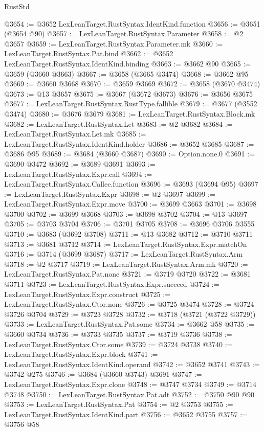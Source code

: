 \begin{lexlean}{RustStd}
\begin{coremodule}
@3654 := @3652 LexLeanTarget.RustSyntax.IdentKind.function
@3656 := @3651 (@3654 @90)
@3657 := LexLeanTarget.RustSyntax.Parameter
@3658 := @2 @3657
@3659 := LexLeanTarget.RustSyntax.Parameter.mk
@3660 := LexLeanTarget.RustSyntax.Pat.bind
@3662 := @3652 LexLeanTarget.RustSyntax.IdentKind.binding
@3663 := @3662 @90
@3665 := @3659 (@3660 @3663)
@3667 := @3658 (@3665 @3474)
@3668 := @3662 @95
@3669 := @3660 @3668
@3670 := @3659 @3669
@3672 := @3658 (@3670 @3474)
@3673 := @13 @3657
@3675 := @3667 (@3672 @3673)
@3676 := @3656 @3675
@3677 := LexLeanTarget.RustSyntax.RustType.fallible
@3679 := @3677 (@3552 @3474)
@3680 := @3676 @3679
@3681 := LexLeanTarget.RustSyntax.Block.mk
@3682 := LexLeanTarget.RustSyntax.Let
@3683 := @2 @3682
@3684 := LexLeanTarget.RustSyntax.Let.mk
@3685 := LexLeanTarget.RustSyntax.IdentKind.holder
@3686 := @3652 @3685
@3687 := @3686 @95
@3689 := @3684 (@3660 @3687)
@3690 := Option.none.{0}
@3691 := @3690 @3472
@3692 := @3689 @3691
@3693 := LexLeanTarget.RustSyntax.Expr.call
@3694 := LexLeanTarget.RustSyntax.Callee.function
@3696 := @3693 (@3694 @95)
@3697 := LexLeanTarget.RustSyntax.Expr
@3698 := @2 @3697
@3699 := LexLeanTarget.RustSyntax.Expr.move
@3700 := @3699 @3663
@3701 := @3698 @3700
@3702 := @3699 @3668
@3703 := @3698 @3702
@3704 := @13 @3697
@3705 := @3703 @3704
@3706 := @3701 @3705
@3708 := @3696 @3706 @3555
@3710 := @3683 (@3692 @3708)
@3711 := @13 @3682
@3712 := @3710 @3711
@3713 := @3681 @3712
@3714 := LexLeanTarget.RustSyntax.Expr.matchOn
@3716 := @3714 (@3699 @3687)
@3717 := LexLeanTarget.RustSyntax.Arm
@3718 := @2 @3717
@3719 := LexLeanTarget.RustSyntax.Arm.mk
@3720 := LexLeanTarget.RustSyntax.Pat.none
@3721 := @3719 @3720
@3722 := @3681 @3711
@3723 := LexLeanTarget.RustSyntax.Expr.succeed
@3724 := LexLeanTarget.RustSyntax.Expr.construct
@3725 := LexLeanTarget.RustSyntax.Ctor.none
@3726 := @3725 @3474
@3728 := @3724 @3726 @3704
@3729 := @3723 @3728
@3732 := @3718 (@3721 (@3722 @3729))
@3733 := LexLeanTarget.RustSyntax.Pat.some
@3734 := @3662 @58
@3735 := @3660 @3734
@3736 := @3733 @3735
@3737 := @3719 @3736
@3738 := LexLeanTarget.RustSyntax.Ctor.some
@3739 := @3724 @3738
@3740 := LexLeanTarget.RustSyntax.Expr.block
@3741 := LexLeanTarget.RustSyntax.IdentKind.operand
@3742 := @3652 @3741
@3743 := @3742 @275
@3746 := @3684 (@3660 @3743) @3691
@3747 := LexLeanTarget.RustSyntax.Expr.clone
@3748 := @3747 @3734
@3749 := @3714 @3748
@3750 := LexLeanTarget.RustSyntax.Pat.adt
@3752 := @3750 @90 @90
@3753 := LexLeanTarget.RustSyntax.Pat
@3754 := @2 @3753
@3755 := LexLeanTarget.RustSyntax.IdentKind.part
@3756 := @3652 @3755
@3757 := @3756 @58

\end{coremodule}
\end{lexlean}
